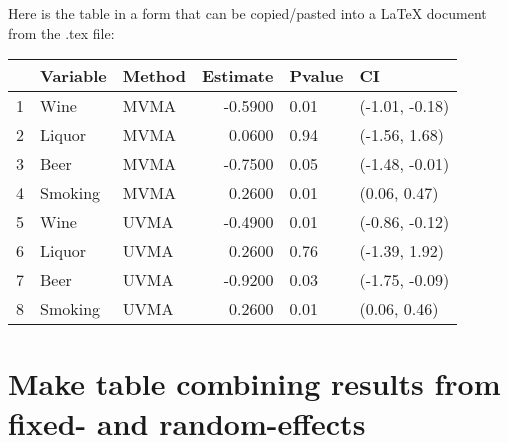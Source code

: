 \documentclass{article}\usepackage[]{graphicx}\usepackage[]{color}
\begin{document}
Here is the table in a form that can be copied/pasted into a LaTeX document from the .tex file:
\begin{table}[ht]
\centering
\begin{tabular}{rllrll}
  \hline
 & Variable & Method & Estimate & Pvalue & CI \\ 
  \hline
1 & Wine & MVMA & -0.5900 & 0.01 & (-1.01, -0.18) \\ 
  2 & Liquor & MVMA & 0.0600 & 0.94 & (-1.56, 1.68) \\ 
  3 & Beer & MVMA & -0.7500 & 0.05 & (-1.48, -0.01) \\ 
  4 & Smoking & MVMA & 0.2600 & 0.01 & (0.06, 0.47) \\ 
  5 & Wine & UVMA & -0.4900 & 0.01 & (-0.86, -0.12) \\ 
  6 & Liquor & UVMA & 0.2600 & 0.76 & (-1.39, 1.92) \\ 
  7 & Beer & UVMA & -0.9200 & 0.03 & (-1.75, -0.09) \\ 
  8 & Smoking & UVMA & 0.2600 & 0.01 & (0.06, 0.46) \\ 
   \hline
\end{tabular}
\end{table}


\section{Make table combining results from fixed- and random-effects}
\end{document}
